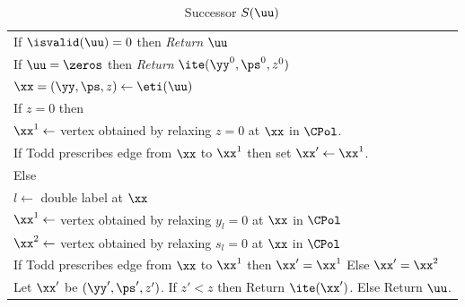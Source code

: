 \begin{table}[!htb]
\caption{Successor $S(\uu)$}\label{tab:S}
\begin{tabular}{|l|}
\hline
\hspace{5pt} If $\isvalid(\uu)=0$ then {\em Return} $\uu$\\
\hspace{5pt} If $\uu=\zeros$ then {\em Return} $\ite(\yy^0,\ps^0,z^0)$\\
\hspace{5pt} $\xx=(\yy,\ps,z) \leftarrow \eti(\uu)$\\
\hspace{5pt} If $z=0$ then \\
\hspace{10pt} $\xx^1\leftarrow$ vertex obtained by relaxing $z=0$ at $\xx$ in $\CPol$. \\
\hspace{10pt} If Todd \cite{todd1976orientation} prescribes edge from $\xx$ to $\xx^1$ then set $\xx'\leftarrow \xx^1$.\\
\hspace{5pt} Else\\
\hspace{10pt} $l\leftarrow $ double label at $\xx$\\
\hspace{10pt} $\xx^1\leftarrow $ vertex obtained by relaxing $y_l=0$ at $\xx$ in $\CPol$ \\
\hspace{10pt} $\xx^2\leftarrow $ vertex obtained by relaxing $s_l=0$ at $\xx$ in $\CPol$ \\
\hspace{10pt} If Todd \cite{todd1976orientation} prescribes edge from $\xx$ to $\xx^1$ then $\xx'=\xx^1$ Else $\xx'=\xx^2$\\
\hspace{10pt} Let $\xx'$ be $(\yy',\ps',z')$. If $z'<z$ then Return $\ite(\xx')$. Else Return $\uu$.\\
\hline
\end{tabular}
\end{table}

